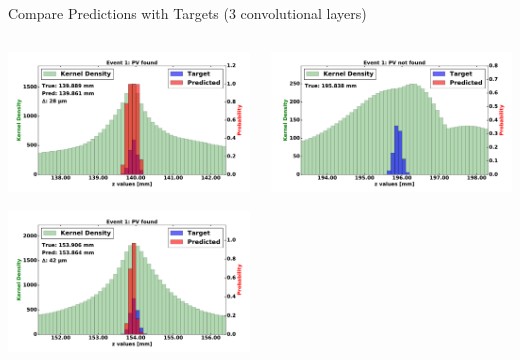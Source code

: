 \begin{frame}{Compare Predictions with Targets (3 convolutional layers)}
  \begin{columns}[c]
        \begin{center}
            \includegraphics[width=1\textwidth,height=0.45\textwidth, trim=18 0 18 0]{images/120000_3layer_08.pdf}

            \includegraphics[width=1\textwidth, height=0.45\textwidth,trim=18 0 18 0]{images/120000_3layer_09.pdf}

        \end{center}
        \begin{center}
           \includegraphics[width=1\textwidth, height=0.45\textwidth, trim=18 0 18 0]{images/120000_3layer_10.pdf}


\end{center}
\end{columns}
\end{frame}
